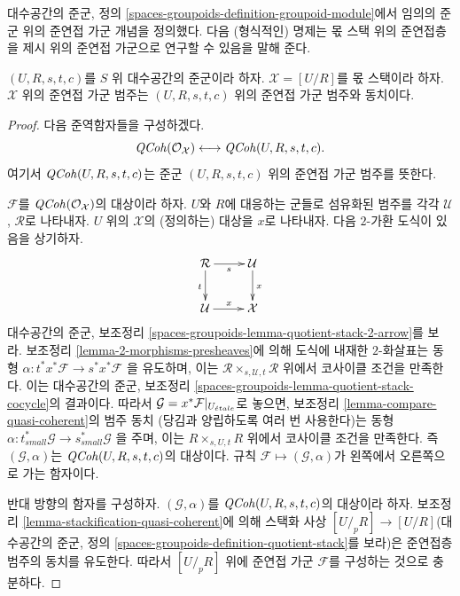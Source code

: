 \noindent
대수공간의 준군, 정의
\ref{spaces-groupoids-definition-groupoid-module}에서 임의의 준군 위의
준연접 가군 개념을 정의했다. 다음 (형식적인) 명제는 몫 스택 위의
준연접층을 제시 위의 준연접 가군으로 연구할 수 있음을 말해 준다.

\begin{proposition}
\label{proposition-quasi-coherent}
$(U, R, s, t, c)$를 $S$ 위 대수공간의 준군이라 하자.
$\mathcal{X} = [U/R]$를 몫 스택이라 하자.
$\mathcal{X}$ 위의 준연접 가군 범주는
$(U, R, s, t, c)$ 위의 준연접 가군 범주와 동치이다.
\end{proposition}

\begin{proof}
다음 준역함자들을 구성하겠다.
$$
\mathit{QCoh}(\mathcal{O}_\mathcal{X})
\longleftrightarrow
\mathit{QCoh}(U, R, s, t, c).
$$
여기서 $\mathit{QCoh}(U, R, s, t, c)$는 준군 $(U, R, s, t, c)$ 위의
준연접 가군 범주를 뜻한다.

\medskip\noindent
$\mathcal{F}$를 $\mathit{QCoh}(\mathcal{O}_\mathcal{X})$의 대상이라 하자.
$U$와 $R$에 대응하는 군들로 섬유화된 범주를 각각
$\mathcal{U}$, $\mathcal{R}$로 나타내자.
$U$ 위의 $\mathcal{X}$의 (정의하는) 대상을 $x$로 나타내자.
다음 $2$-가환 도식이 있음을 상기하자.
$$
\xymatrix{
\mathcal{R} \ar[r]_s \ar[d]_t & \mathcal{U} \ar[d]^x \\
\mathcal{U} \ar[r]^x & \mathcal{X}
}
$$
대수공간의 준군, 보조정리
\ref{spaces-groupoids-lemma-quotient-stack-2-arrow}를 보라.
보조정리 \ref{lemma-2-morphisms-presheaves}에 의해 도식에 내재한
$2$-화살표는 동형
$\alpha : t^*x^*\mathcal{F} \to s^*x^*\mathcal{F}$
을 유도하며, 이는
$\mathcal{R} \times_{s, \mathcal{U}, t} \mathcal{R}$ 위에서
코사이클 조건을 만족한다. 이는 대수공간의 준군, 보조정리
\ref{spaces-groupoids-lemma-quotient-stack-cocycle}의 결과이다.
따라서 $\mathcal{G} = x^*\mathcal{F}|_{U_{\acute{e}tale}}$로 놓으면,
보조정리 \ref{lemma-compare-quasi-coherent}의 범주 동치
(당김과 양립하도록 여러 번 사용한다)는 동형
$\alpha : t_{small}^*\mathcal{G} \to s_{small}^*\mathcal{G}$
을 주며, 이는 $R \times_{s, U, t} R$ 위에서 코사이클 조건을
만족한다. 즉 $(\mathcal{G}, \alpha)$는
$\mathit{QCoh}(U, R, s, t, c)$의 대상이다.
규칙 $\mathcal{F} \mapsto (\mathcal{G}, \alpha)$가 왼쪽에서
오른쪽으로 가는 함자이다.

\medskip\noindent
반대 방향의 함자를 구성하자.
$(\mathcal{G}, \alpha)$를 $\mathit{QCoh}(U, R, s, t, c)$의 대상이라 하자.
보조정리 \ref{lemma-stackification-quasi-coherent}에 의해 스택화 사상
$[U/_{\!p}R] \to [U/R]$(대수공간의 준군, 정의
\ref{spaces-groupoids-definition-quotient-stack}를 보라)은
준연접층 범주의 동치를 유도한다. 따라서 $[U/_{\!p}R]$ 위에
준연접 가군 $\mathcal{F}$를 구성하는 것으로 충분하다.


\end{proof}
